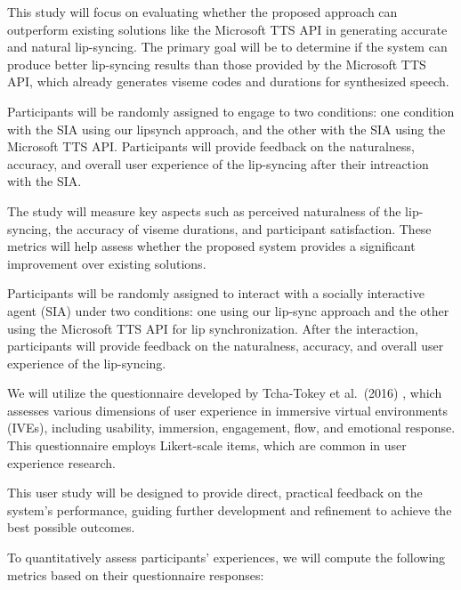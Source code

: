 \documentclass[12pt]{article}
\begin{document}
This study will focus on evaluating whether the proposed approach can outperform existing solutions like the Microsoft TTS API in generating accurate and natural lip-syncing. The primary goal will be to determine if the system can produce better lip-syncing results than those provided by the Microsoft TTS API, which already generates viseme codes and durations for synthesized speech. 

Participants will be randomly assigned to engage to two conditions: one condition with the SIA using our lipsynch approach, and the other with the SIA using the Microsoft TTS API. Participants will provide feedback on the naturalness, accuracy, and overall user experience of the lip-syncing after their intreaction with the SIA. 

The study will measure key aspects such as perceived naturalness of the lip-syncing, the accuracy of viseme durations, and participant satisfaction. These metrics will help assess whether the proposed system provides a significant improvement over existing solutions.

Participants will be randomly assigned to interact with a socially interactive agent (SIA) under two conditions: one using our lip-sync approach and the other using the Microsoft TTS API for lip synchronization. After the interaction, participants will provide feedback on the naturalness, accuracy, and overall user experience of the lip-syncing.

We will utilize the questionnaire developed by Tcha-Tokey et al.\ (2016) \cite{Tcha-Tokey2016AEnvironments}, which assesses various dimensions of user experience in immersive virtual environments (IVEs), including usability, immersion, engagement, flow, and emotional response. This questionnaire employs Likert-scale items, which are common in user experience research.

This user study will be designed to provide direct, practical feedback on the system’s performance, guiding further development and refinement to achieve the best possible outcomes.

To quantitatively assess participants' experiences, we will compute the following metrics based on their questionnaire responses:
\end{document}
